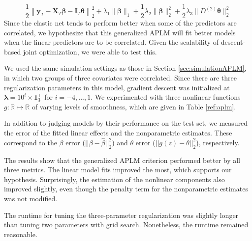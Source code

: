 \documentclass[10pt,letterpaper]{article}
\begin{document}
\begin{equation}
\frac{1}{2} \left \|
\boldsymbol{y}_T
- \boldsymbol{X}_T\boldsymbol{\beta}
- \boldsymbol{I}_T \boldsymbol{\theta} \right \|^2_2
+ \lambda_1 \| \boldsymbol \beta \|_1
+ \frac{1}{2} \lambda_2 \| \boldsymbol \beta \|_2^2
+ \frac{1}{2} \lambda_3 \| D^{(2)} \boldsymbol \theta \|_2^2
\end{equation}
Since the elastic net tends to perform better when some of the predictors are correlated, we hypothesize that this generalized APLM will fit better models when the linear predictors are to be correlated. Given the scalability of descent-based joint optimization, we were able to test this.

We used the same simulation settings as those in Section \ref{sec:simulationAPLM}, in which two groups of three covariates were correlated. Since there are three regularization parameters in this model, gradient descent was initialized at $\boldsymbol{\lambda} = 10^i \times \boldsymbol 1_3^\top$ for $i=-4, ..., 1$. We experimented with three nonlinear functions $g:\mathbb{R} \mapsto \mathbb{R}$ of varying levels of smoothness, which are given in Table \ref{ref:aplm}.

In addition to judging models by their performance on the test set, we measured the error of the fitted linear effects and the nonparametric estimates. These correspond to the $\beta$ error ($||\beta - \hat \beta||_2^2$) and $\theta$ error ($|| g(z) - \theta ||_2^2$), respectively.

The results show that the generalized APLM criterion performed better by all three metrics. The linear model fits improved the most, which supports our hypothesis. Surprisingly, the estimation of the nonlinear components also improved slightly, even though the penalty term for the nonparametric estimates was not modified.

The runtime for tuning the three-parameter regularization was slightly longer than tuning two parameters with grid search. Nonetheless, the runtime remained reasonable.

\end{document}
